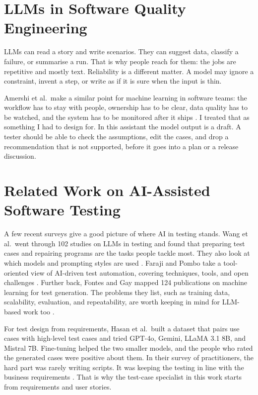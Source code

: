 \section{LLMs in Software Quality Engineering}
LLMs can read a story and write scenarios. They can suggest data, classify a failure, or summarise a run. That is why people reach for them: the jobs are repetitive and mostly text. Reliability is a different matter. A model may ignore a constraint, invent a step, or write as if it is sure when the input is thin.

Amershi et al.\ make a similar point for machine learning in software teams: the workflow has to stay with people, ownership has to be clear, data quality has to be watched, and the system has to be monitored after it ships \cite{amershi2019}. I treated that as something I had to design for. In this assistant the model output is a draft. A tester should be able to check the assumptions, edit the cases, and drop a recommendation that is not supported, before it goes into a plan or a release discussion.

\section{Related Work on AI-Assisted Software Testing}
A few recent surveys give a good picture of where AI in testing stands. Wang et al.\ went through 102 studies on LLMs in testing and found that preparing test cases and repairing programs are the tasks people tackle most. They also look at which models and prompting styles are used \cite{wang2024testingllm}. Faraji and Pombo take a tool-oriented view of AI-driven test automation, covering techniques, tools, and open challenges \cite{faraji2025aitestautomation}. Further back, Fontes and Gay mapped 124 publications on machine learning for test generation. The problems they list, such as training data, scalability, evaluation, and repeatability, are worth keeping in mind for LLM-based work too \cite{fontes2023mltestgen}.

For test design from requirements, Hasan et al.\ built a dataset that pairs use cases with high-level test cases and tried GPT-4o, Gemini, LLaMA 3.1 8B, and Mistral 7B. Fine-tuning helped the two smaller models, and the people who rated the generated cases were positive about them. In their survey of practitioners, the hard part was rarely writing scripts. It was keeping the testing in line with the business requirements \cite{hasan2025highlevel}. That is why the test-case specialist in this work starts from requirements and user stories.

